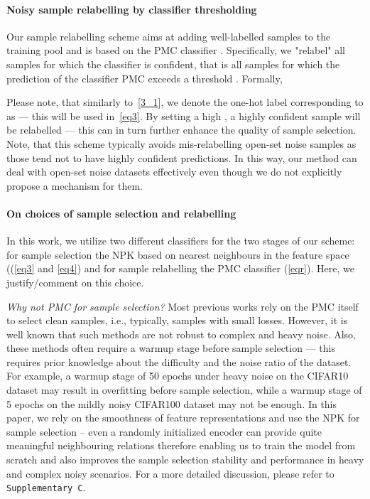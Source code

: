 \documentclass{bmvc2k}
\begin{document}
\paragraph{Noisy sample relabelling by classifier thresholding}
\label{3_3_2}



Our sample relabelling scheme aims at adding well-labelled samples to the training pool and is based on the PMC classifier . Specifically, we "relabel" all samples for which the classifier is confident, that is all samples  for which the prediction  of the classifier PMC  exceeds a threshold . Formally,


Please note, that similarly to~\cref{3_1}, we denote the one-hot label corresponding to  as  --- this will be used in~\cref{eq3}. 
By setting a high , a highly confident sample  will be relabelled --- this can in turn further enhance the quality of sample selection. Note, that this scheme typically avoids mis-relabelling open-set noise samples as those tend not to have highly confident predictions. In this way, our method can deal with open-set noise datasets effectively even though we do not explicitly propose a mechanism for them.


\paragraph{On choices of sample selection and relabelling}
\label{3_3_3}
In this work, we utilize two different classifiers for the two stages of our scheme: for sample selection the NPK  based on nearest neighbours in the feature space  ((\cref{eq3} and \cref{eq4}) and for sample relabelling the PMC  classifier (\cref{eqr}). Here, we justify/comment on this choice.


\textit{Why not PMC  for sample selection?}
\quad Most previous works rely on the PMC  itself to select clean samples, i.e., typically, samples with small losses. However, it is well known that such methods are not robust to complex and heavy noise. Also, these methods often require a warmup stage before sample selection --- this requires prior knowledge about the difficulty and the noise ratio of the dataset. For example, a warmup stage of 50 epochs under heavy noise on the CIFAR10 dataset may result in overfitting before sample selection, while a warmup stage of 5 epochs on the mildly noisy CIFAR100 dataset may not be enough. In this paper, we rely on the smoothness of feature representations and use the NPK  for sample selection -- even a randomly initialized encoder can provide quite meaningful neighbouring relations therefore enabling us to train the model from scratch and also improves the sample selection stability and performance in heavy and complex noisy scenarios. For a more detailed discussion, please refer to \texttt{Supplementary C}.
\end{document}
